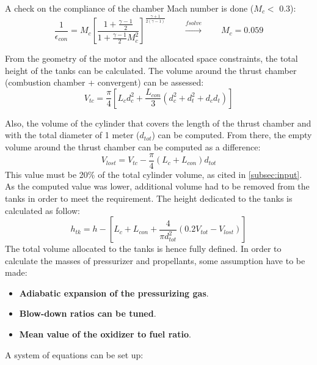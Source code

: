 A check on the compliance of the chamber Mach number is done ($M_c <$ 0.3):
\begin{equation}    
    \frac{1}{\epsilon_{con}} = M_c \left[ \frac{1 + \frac{\gamma - 1}{2}}{1 + \frac{\gamma - 1}{2} M_c^2} \right]^{\frac{\gamma + 1}{2(\gamma - 1)}}
    \qquad \xrightarrow{\textit{fsolve}} \qquad M_c = 0.059
\end{equation}

From the geometry of the motor and the allocated space constraints, the total height of the tanks can be calculated. The volume around the thrust chamber (combustion chamber + convergent) can be assessed:
\begin{equation}
    V_{tc} = \frac{\pi}{4} \left[L_c d_c^2  + \frac{L_{con}}{3} \left(d_c^2 + d_t^2 + d_c d_t\right)\right]
    \label{eq:v_tc}
\end{equation}

Also, the volume of the cylinder that covers the length of the thrust chamber and with the total diameter of 1 meter ($d_{tot}$) can be computed. From there, the empty volume around the thrust chamber can be computed as a difference:
\begin{equation}
    V_{lost} =  V_{tc} - \frac{\pi}{4} \left(L_{c} + L_{con}\right) d_{tot}
\end{equation}
This value must be 20\% of the total cylinder volume, as cited in \autoref{subsec:input}. As the computed value was lower, additional volume had to be removed from the tanks in order to meet the requirement. The height dedicated to the tanks is calculated as follow:
\begin{equation}
    h_{tk} =  h - \left[L_{c} + L_{con} + \frac{4}{\pi d_{tot}^2}\left( 0.2 V_{tot} - V_{lost}\right) \right]
\end{equation}
The total volume allocated to the tanks is hence fully defined. 
In order to calculate the masses of pressurizer and propellants, some assumption have to be made:
\begin{itemize}
    \item \textbf{Adiabatic expansion of the pressurizing gas}.
    \item \textbf{Blow-down ratios can be tuned}.
    \item \textbf{Mean value of the oxidizer to fuel ratio}.
\end{itemize}

A system of equations can be set up:

